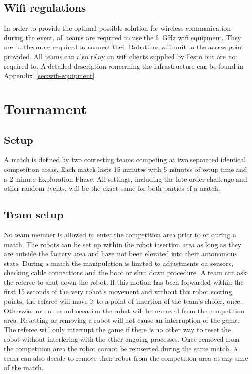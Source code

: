\documentclass[12pt,twoside]{article}
\begin{document}
\subsection{Wifi regulations}
\label{sec:wifi-regulations}
In order to provide the optimal possible solution for wireless
communication during the event, all teams are required to use the \SI{5}{\giga\hertz} wifi equipment. They are furthermore required to connect their
Robotinos wifi unit to the access point provided. All teams can also
relay on wifi clients supplied by Festo but are not required to. A
detailed description concerning the infrastructure can be found in
Appendix~\ref{sec:wifi-equipment}.



\section{Tournament}
\subsection{Setup}

A match is defined by two contesting teams competing at two separated
identical competition areas. Each match lasts 15 minutes with 5
minutes of setup time and a 2 minute Exploration Phase. All settings,
including the late order challenge and other random events, will be
the exact same for both parties of a match.

\subsection{Team setup}
\label{sec:team-setup}
No team member is allowed to enter the competition area prior to or
during a match. The robots can be set up within the robot insertion
area as long as they are outside the factory area and have not been
elevated into their autonomous state. During a match the manipulation
is limited to adjustments on sensors, checking cable connections and
the boot or shut down procedure. A team can ask the referee to shut
down the robot. If this motion has been forwarded within the first 15
seconds of the very robot's movement and without this robot scoring
points, the referee will move it to a point of insertion of the team's
choice, once. Otherwise or on second occasion the robot will be
removed from the competition area. Resetting or removing a robot will
not cause an interruption of the game. The referee will only interrupt
the game if there is no other way to reset the robot without
interfering with the other ongoing processes. Once removed from the
competition area the robot cannot be reinserted during the same match.
A team can also decide to remove their robot from the competition area
at any time of the match.
\end{document}
